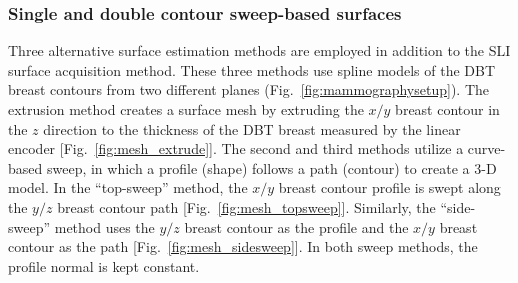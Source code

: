 \subsubsection{Single and double contour sweep-based surfaces}
Three alternative surface estimation methods are employed in addition to the \ac{SLI} surface acquisition method. These three methods use spline models of the \ac{DBT} breast contours from two different planes (Fig.~\ref{fig:mammographysetup}). The extrusion method creates a surface mesh by extruding the $x/y$ breast contour in the $z$ direction to the thickness of the \ac{DBT} breast measured by the linear encoder [Fig.~\ref{fig:mesh_extrude}]. The second and third methods utilize a curve-based sweep, in which a profile (shape) follows a path (contour) to create a 3-D model. In the ``top-sweep'' method, the $x/y$ breast contour profile is swept along the $y/z$ breast contour path [Fig.~\ref{fig:mesh_topsweep}]. Similarly, the ``side-sweep'' method uses the $y/z$ breast contour as the profile and the $x/y$ breast contour as the path [Fig.~\ref{fig:mesh_sidesweep}]. In both sweep methods, the profile normal is kept constant.

